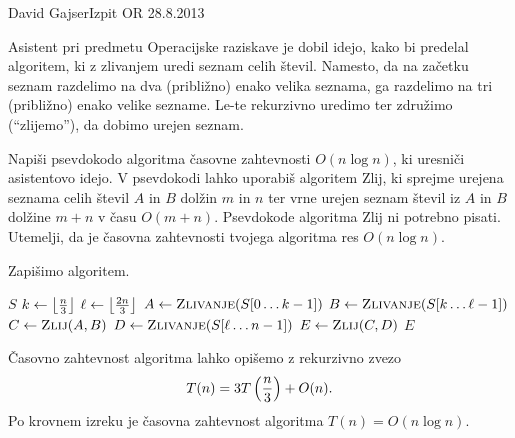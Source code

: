 \begin{naloga}{David Gajser}{Izpit OR 28.8.2013}
\begin{vprasanje}
Asistent pri predmetu Operacijske raziskave je dobil idejo,
kako bi predelal algoritem, ki z zlivanjem uredi seznam celih števil.
Namesto,
da na začetku seznam razdelimo na dva (približno) enako velika seznama,
ga razdelimo na tri (približno) enako velike sezname.
Le-te rekurzivno uredimo ter združimo (``zlijemo''), da dobimo urejen seznam.

Napiši psevdokodo algoritma časovne zahtevnosti $O(n \log n)$,
ki uresniči asistentovo idejo.
V psevdokodi lahko uporabiš algoritem {\sc Zlij},
ki sprejme urejena seznama celih števil $A$ in $B$ dolžin $m$ in $n$
ter vrne urejen seznam števil iz $A$ in $B$ dolžine $m+n$ v času $O(m+n)$.
Psevdokode algoritma {\sc Zlij} ni potrebno pisati.
Utemelji, da je časovna zahtevnosti tvojega algoritma res $O(n \log n)$.
\end{vprasanje}

\begin{odgovor}
Zapišimo algoritem.
\begin{small}
\begin{algorithmic}
        \State \Return $S$
    \EndIf
    \State $k \gets \left\lfloor {n \over 3} \right\rfloor$
    \State $\ell \gets \left\lfloor {2n \over 3} \right\rfloor$
    \State $A \gets \text{\sc Zlivanje}(S[0 \dots k-1])$
    \State $B \gets \text{\sc Zlivanje}(S[k \dots \ell-1])$
    \State $C \gets \text{\sc Zlij}(A, B)$
    \State $D \gets \text{\sc Zlivanje}(S[\ell \dots n-1])$
    \State $E \gets \text{\sc Zlij}(C, D)$
    \State \Return $E$
\EndFunction
\end{algorithmic}
\end{small}
Časovno zahtevnost algoritma lahko opišemo z rekurzivno zvezo
$$
T(n) = 3T\left({n \over 3}\right) + O(n) .
$$
Po krovnem izreku je časovna zahtevnost algoritma $T(n) = O(n \log n)$.
\end{odgovor}
\end{naloga}
